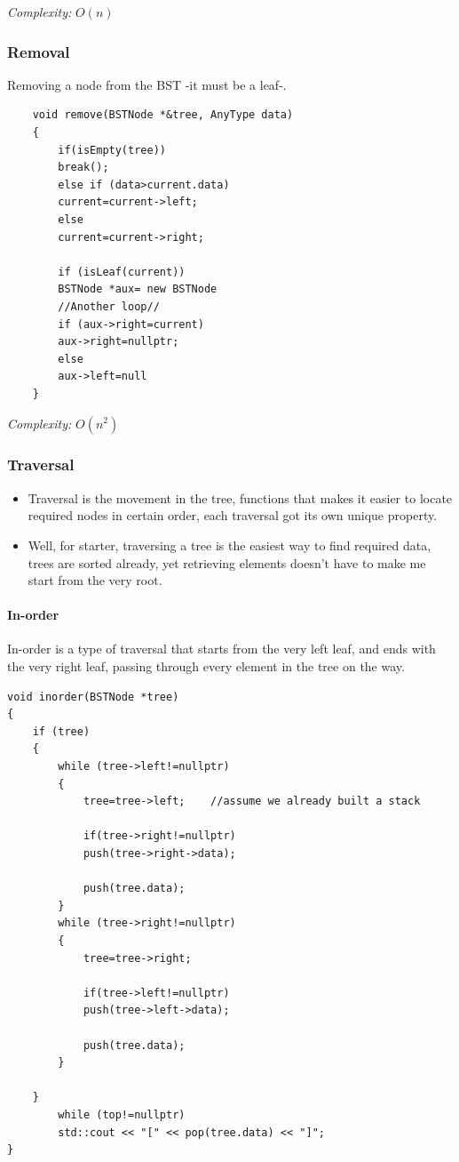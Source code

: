 \documentclass[10pt,a4paper]{article}
\begin{document}
\emph{Complexity:} $O(n)$

\subsubsection{Removal}

 Removing a node from the BST -it must be a leaf-.

\begin{lstlisting}
    void remove(BSTNode *&tree, AnyType data)
    {
        if(isEmpty(tree))
        break();
        else if (data>current.data)
        current=current->left;
        else
        current=current->right;

        if (isLeaf(current))
        BSTNode *aux= new BSTNode
        //Another loop//
        if (aux->right=current)
        aux->right=nullptr;
        else
        aux->left=null
    }
\end{lstlisting}

\emph{Complexity:} $O(n^2)$

\subsubsection{Traversal}

\begin{itemize}
\item Traversal is the movement in the tree, functions that makes it easier to locate required nodes in certain order, each traversal got its own unique property.
\item Well, for starter, traversing a tree is the easiest way to find required data, trees are sorted already, yet retrieving elements doesn't have to make me start from the very root. 
\end{itemize}
 

\paragraph{In-order}

In-order is a type of traversal that starts from the very left leaf, and ends with the very right leaf, passing through every element in the tree on the way.


\begin{lstlisting}
void inorder(BSTNode *tree)
{
    if (tree)
    {
        while (tree->left!=nullptr)
        {
            tree=tree->left;    //assume we already built a stack

            if(tree->right!=nullptr)
            push(tree->right->data);

            push(tree.data);
        }
        while (tree->right!=nullptr)
        {
            tree=tree->right;

            if(tree->left!=nullptr)
            push(tree->left->data);

            push(tree.data);
        }

    }
        while (top!=nullptr)
        std::cout << "[" << pop(tree.data) << "]";
}
\end{lstlisting}
\end{document}
